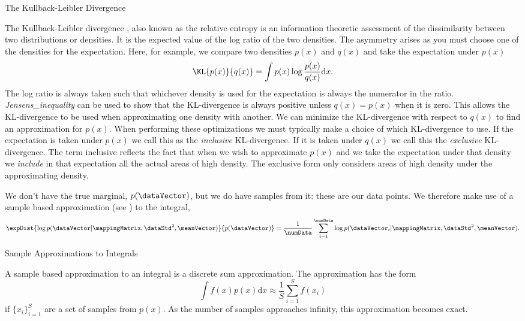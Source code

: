 \begin{boxfloat}
  \caption{The Kullback-Leibler Divergence}\label{box:kldivergence}
  
  \boxfontsize The Kullback-Leibler divergence \cite{Kullback:info51},
  also known as the relative entropy  is an
  information theoretic assessment of the dissimilarity between two
  distributions or densities. It is the expected value of the log
  ratio of the two densities. The asymmetry arises as you must choose
  one of the densities for the expectation. Here, for example, we
  compare two densities $p(x)$ and $q(x)$ and take the expectation
  under $p(x)$
  \[
  \KL{p(x)}{q(x)} = \int p(x) \log \frac{p(x)}{q(x)} \text{d}x.
  \]
  The log ratio is always taken such that whichever density is used
  for the expectation is always the numerator in the ratio. \emph{\gls{Jensens_inequality}}
  can be used to show that the KL-divergence is always
  positive unless $q(x)=p(x)$ when it is zero. This allows the
  KL-divergence to be used when approximating one density with
  another. We can minimize the KL-divergence with respect to $q(x)$ to
  find an approximation for $p(x)$. When performing these
  optimizations we must typically make a choice of which KL-divergence
  to use. If the expectation is taken under $p(x)$ we call this as the
  \emph{inclusive} KL-divergence. If it is taken under $q(x)$ we call
  this the \emph{exclusive} KL-divergence. The term inclusive reflects
  the fact that when we wish to approximate $p(x)$ and we take the
  expectation under that density we \emph{include} in that expectation
  all the actual areas of high density. The exclusive form only
  considers areas of high density under the approximating density. 
\end{boxfloat}

We don't have the true marginal, $p(\dataVector)$, but we do have
samples from it: these are our data points. We therefore make use of a
sample based approximation (see ) to the integral,
\[
\expDist{\log
  p(\dataVector| \mappingMatrix, \dataStd^2,
  \meanVector)}{p(\dataVector)} = \frac{1}{\numData}\sum_{i=1}^\numData\log
p(\dataVector_i| \mappingMatrix, \dataStd^2,
\meanVector).
\]

\begin{boxfloat}
  \caption{Sample Approximations to Integrals}\label{box:sample}

  \boxfontsize A sample based approximation to an integral is a discrete sum approximation. The approximation has the form
  \[
  \int f(x) p(x) \text{d}x \approx \frac{1}{S} \sum_{i=1}^Sf(x_i)
  \]
  if $\{x_i\}_{i=1}^S$ are a set of samples from $p(x)$. As the number of samples approaches infinity, this approximation becomes exact.  
\end{boxfloat}


